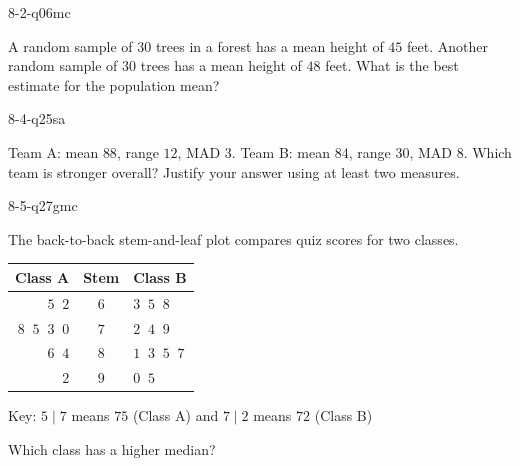 \begin{practiceQuestion}{8-2-q06}{mc}
\begin{questionText}
A random sample of $30$ trees in a forest has a mean height of $45$ feet. Another random sample of $30$ trees has a mean height of $48$ feet. What is the best estimate for the population mean?
\end{questionText}
\end{practiceQuestion}

\begin{practiceQuestion}{8-4-q25}{sa}
\begin{questionText}
Team A: mean $88$, range $12$, MAD $3$. Team B: mean $84$, range $30$, MAD $8$. Which team is stronger overall? Justify your answer using at least two measures.
\end{questionText}
\end{practiceQuestion}

\begin{practiceQuestion}{8-5-q27}{gmc}
\begin{questionText}
The back-to-back stem-and-leaf plot compares quiz scores for two classes.

\begin{center}
\begin{tabular}{r|c|l}
\textbf{Class A} & \textbf{Stem} & \textbf{Class B} \\
\hline
$5\;\;2$ & $6$ & $3\;\;5\;\;8$ \\
$8\;\;5\;\;3\;\;0$ & $7$ & $2\;\;4\;\;9$ \\
$6\;\;4$ & $8$ & $1\;\;3\;\;5\;\;7$ \\
$2$ & $9$ & $0\;\;5$
\end{tabular}

Key: $5 \mid 7$ means $75$ (Class A) and $7 \mid 2$ means $72$ (Class B)
\end{center}

Which class has a higher median?
\end{questionText}
\end{practiceQuestion}

